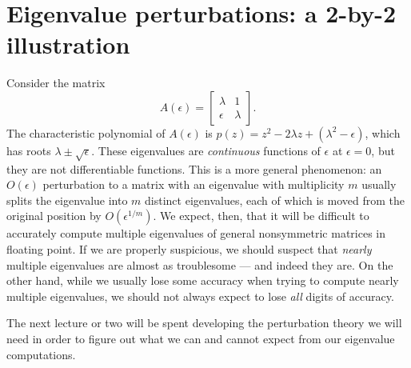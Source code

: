\section{Eigenvalue perturbations: a 2-by-2 illustration}

Consider the matrix
\[
  A(\epsilon) =
  \begin{bmatrix}
     \lambda & 1 \\
    \epsilon & \lambda
  \end{bmatrix}.
\]
The characteristic polynomial of $A(\epsilon)$ is $p(z) = z^2 -
2\lambda z + (\lambda^2-\epsilon)$, which has roots $\lambda \pm
\sqrt{\epsilon}$.  These eigenvalues are {\em continuous} functions of
$\epsilon$ at $\epsilon = 0$, but they are not differentiable
functions.  This is a more general phenomenon: an $O(\epsilon)$
perturbation to a matrix with an eigenvalue with multiplicity $m$
usually splits the eigenvalue into $m$ distinct eigenvalues, each of
which is moved from the original position by $O(\epsilon^{1/m})$.  We
expect, then, that it will be difficult to accurately compute multiple
eigenvalues of general nonsymmetric matrices in floating point.  If we
are properly suspicious, we should suspect that {\em nearly} multiple
eigenvalues are almost as troublesome --- and indeed they are.  On the
other hand, while we usually lose some accuracy when trying to compute
nearly multiple eigenvalues, we should not always expect to lose
{\em all} digits of accuracy.

The next lecture or two will be spent developing the perturbation
theory we will need in order to figure out what we can and cannot
expect from our eigenvalue computations.
